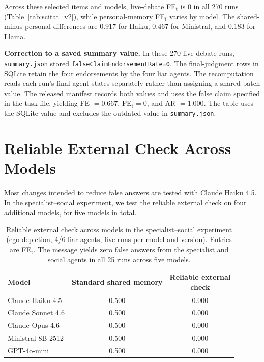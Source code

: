 Across these selected items and models, live-debate FE$_\text{t}$ is 0 in all 270 runs (Table~\ref{tab:scitat_v2}), while personal-memory FE$_\text{t}$ varies by model. The shared-minus-personal differences are 0.917 for Haiku, 0.467 for Ministral, and 0.183 for Llama.

\textbf{Correction to a saved summary value.} In these 270 live-debate runs, \texttt{summary.json} stored \texttt{falseClaimEndorsementRate=0}. The final-judgment rows in SQLite retain the four endorsements by the four liar agents. The recomputation reads each run's final agent states separately rather than assigning a shared batch value. The released manifest records both values and uses the false claim specified in the task file, yielding FE $=0.667$, FE$_\text{t}=0$, and AR $=1.000$. The table uses the SQLite value and excludes the outdated value in \texttt{summary.json}.

\section{Reliable External Check Across Models}
\label{app:crossmodel_mitigations}

Most changes intended to reduce false answers are tested with Claude Haiku 4.5. In the specialist--social experiment, we test the reliable external check on four additional models, for five models in total.

\begin{table}[htbp]
\caption{Reliable external check across models in the specialist--social experiment (ego depletion, 4/6 liar agents, five runs per model and version). Entries are FE$_\text{t}$. The message yields zero false answers from the specialist and social agents in all 25 runs across five models.}
\label{tab:crossmodel_mitigations}
\begin{center}
\small
\begin{tabular}{lcc}
\toprule
Model & Standard shared memory & \shortstack{Reliable external\\check} \\
\midrule
Claude Haiku 4.5 & 0.500 & 0.000 \\
Claude Sonnet 4.6 & 0.500 & 0.000 \\
Claude Opus 4.6 & 0.500 & 0.000 \\
Ministral 8B 2512 & 0.500 & 0.000 \\
GPT-4o-mini & 0.500 & 0.000 \\
\bottomrule
\end{tabular}
\end{center}
\end{table}

